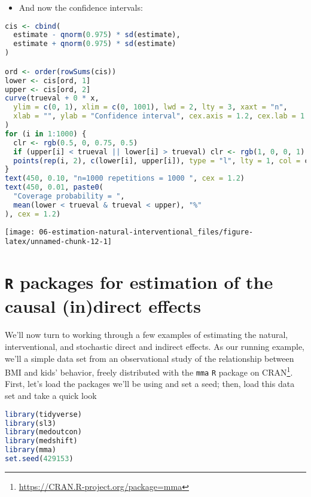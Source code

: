\documentclass[
  12pt,
]{book}
\newcommand{\passthrough}[1]{#1}
\providecommand{\tightlist}{%
  \setlength{\itemsep}{0pt}\setlength{\parskip}{0pt}}
\renewcommand{\href}[2]{#2\footnote{\url{#1}}}
\theoremstyle{definition}
\theoremstyle{definition}
\theoremstyle{definition}
\newcommand{\1}{\mathbbm{1}}
\begin{document}
\begin{itemize}
\tightlist
\item
  And now the confidence intervals:
\end{itemize}

\begin{lstlisting}[language=R]
cis <- cbind(
  estimate - qnorm(0.975) * sd(estimate),
  estimate + qnorm(0.975) * sd(estimate)
)

ord <- order(rowSums(cis))
lower <- cis[ord, 1]
upper <- cis[ord, 2]
curve(trueval + 0 * x,
  ylim = c(0, 1), xlim = c(0, 1001), lwd = 2, lty = 3, xaxt = "n",
  xlab = "", ylab = "Confidence interval", cex.axis = 1.2, cex.lab = 1.2
)
for (i in 1:1000) {
  clr <- rgb(0.5, 0, 0.75, 0.5)
  if (upper[i] < trueval || lower[i] > trueval) clr <- rgb(1, 0, 0, 1)
  points(rep(i, 2), c(lower[i], upper[i]), type = "l", lty = 1, col = clr)
}
text(450, 0.10, "n=1000 repetitions = 1000 ", cex = 1.2)
text(450, 0.01, paste0(
  "Coverage probability = ",
  mean(lower < trueval & trueval < upper), "%"
), cex = 1.2)
\end{lstlisting}

\begin{center}\texttt{[image: 06-estimation-natural-interventional\_files/figure-latex/unnamed-chunk-12-1]} \end{center}

\hypertarget{r-packages-for-estimation-of-the-causal-indirect-effects}{%
\chapter{\texorpdfstring{\texttt{R} packages for estimation of the causal (in)direct effects}{R packages for estimation of the causal (in)direct effects}}\label{r-packages-for-estimation-of-the-causal-indirect-effects}}

We'll now turn to working through a few examples of estimating the natural,
interventional, and stochastic direct and indirect effects. As our running
example, we'll a simple data set from an observational study of the relationship
between BMI and kids' behavior, freely distributed with the \href{https://CRAN.R-project.org/package=mma}{\passthrough{\lstinline!mma!} \passthrough{\lstinline!R!} package
on CRAN}. First, let's load the packages
we'll be using and set a seed; then, load this data set and take a quick look

\begin{lstlisting}[language=R]
library(tidyverse)
library(sl3)
library(medoutcon)
library(medshift)
library(mma)
set.seed(429153)
\end{lstlisting}
\end{document}
